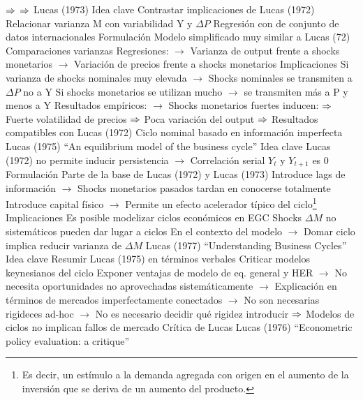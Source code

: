 \documentclass{nuevotema}
\begin{document}
\begin{esquemal}
				\4[] $\Rightarrow$ 
				\4[] $\Rightarrow$ 
			\3 Lucas (1973)
				\4 Idea clave
				\4[] Contrastar implicaciones de Lucas (1972)
				\4[] Relacionar varianza M con variabilidad Y y $\Delta P$
				\4[] Regresión con de conjunto de datos internacionales
				\4 Formulación
				\4[] Modelo simplificado muy similar a Lucas (72)
				\4[] Comparaciones varianzas
				\4[] Regresiones:
				\4[] $\to$ Varianza de output frente a shocks monetarios
				\4[] $\to$ Variación de precios frente a shocks monetarios
				\4 Implicaciones
				\4[] Si varianza de shocks nominales muy elevada
				\4[] $\to$ Shocks nominales se transmiten a $\Delta P$ no a Y
				\4[] Si shocks monetarios se utilizan mucho
				\4[] $\to$ se transmiten más a P y menos a Y
				\4[] Resultados empíricos:
				\4[] $\to$ Shocks monetarios fuertes inducen:
				\4[] $\Rightarrow$ Fuerte volatilidad de precios
				\4[] $\Rightarrow$ Poca variación del output
				\4[] $\Rightarrow$ Resultados compatibles con Lucas (1972)
		\2 Ciclo nominal basado en información imperfecta
			\3 Lucas (1975)
				\4 ``An equilibrium model of the business cycle''
				\4 Idea clave
				\4[] Lucas (1972) no permite inducir persistencia
				\4[] $\to$ Correlación serial $Y_t$ y $Y_{t+1}$ es 0
				\4 Formulación
				\4[] Parte de la base de Lucas (1972) y Lucas (1973)
				\4[] Introduce lags de información
				\4[] $\to$ Shocks monetarios pasados tardan en conocerse totalmente
				\4[] Introduce capital físico
				\4[] $\to$ Permite un efecto acelerador típico del ciclo\footnote{Es decir, un estímulo a la demanda agregada con origen en el aumento de la inversión que se deriva de un aumento del producto.}
				\4 Implicaciones
				\4[] Es posible modelizar ciclos económicos en EGC
				\4[] Shocks $\Delta M$ no sistemáticos pueden dar lugar a ciclos
				\4[] En el contexto del modelo
				\4[] $\to$ Domar ciclo implica reducir varianza de $\Delta M$
			\3 Lucas (1977)
				\4 ``Understanding Business Cycles''
				\4 Idea clave
				\4[] Resumir Lucas (1975) en términos verbales
				\4[] Criticar modelos keynesianos del ciclo
				\4[] Exponer ventajas de modelo de eq. general y HER
				\4[] $\to$ No necesita oportunidades no aprovechadas sistemáticamente
				\4[] $\to$ Explicación en términos de mercados imperfectamente conectados
				\4[] $\to$ No son necesarias rigideces ad-hoc
				\4[] $\to$ No es necesario decidir qué rigidez introducir
				\4[] $\Rightarrow$ Modelos de ciclos no implican fallos de mercado
		\2 Crítica de Lucas
			\3 Lucas (1976)
				\4 ``Econometric policy evaluation: a critique''

\end{esquemal}
\end{document}
